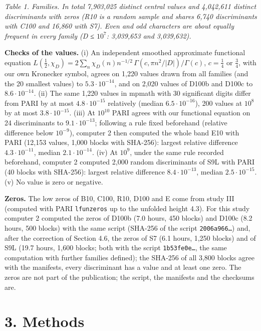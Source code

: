 \documentclass[
  10pt,
]{article}
\begin{document}
\emph{Table 1. Families. In total 7,903,025 distinct central values and
4,042,611 distinct discriminants with zeros (R10 is a random sample and
shares 6,740 discriminants with C100 and 16,860 with S7). Even and odd
characters are about equally frequent in every family
(\textbar D\textbar{} ≤ \(10^7\): 3,039,653 and 3,039,632).}

\textbf{Checks of the values.} (i) An independent smoothed approximate
functional equation
\(L(\tfrac12, \chi_D) = 2\sum_n \chi_D(n) n^{-1/2}\,\Gamma(c, \pi n^2/|D|)/\Gamma(c)\),
\(c = \tfrac14\) or \(\tfrac34\), with our own Kronecker symbol, agrees
on 1,220 values drawn from all families (and the 20 smallest values) to
\(5.3\cdot10^{-14}\), and on 2,020 values of D100b and D100c to
\(8.6\cdot10^{-14}\). (ii) The same 1,220 values in mpmath with 30
significant digits differ from PARI by at most \(4.8\cdot10^{-15}\)
relatively (median \(6.5\cdot10^{-16}\)), 200 values at \(10^8\) by at
most \(3.8\cdot10^{-15}\). (iii) At \(10^{10}\) PARI agrees with our
functional equation on 24 discriminants to \(9.1\cdot10^{-13}\);
following a rule fixed beforehand (relative difference below
\(10^{-9}\)), computer 2 then computed the whole band E10 with PARI
(12,153 values, 1,000 blocks with SHA-256): largest relative difference
\(4.3\cdot10^{-11}\), median \(2.1\cdot10^{-14}\). (iv) At \(10^9\),
under the same rule recorded beforehand, computer 2 computed 2,000
random discriminants of S9L with PARI (40 blocks with SHA-256): largest
relative difference \(8.4\cdot10^{-13}\), median \(2.5\cdot10^{-15}\).
(v) No value is zero or negative.

\textbf{Zeros.} The low zeros of B10, C100, R10, D100 and E come from
study III (computed with PARI \texttt{lfunzeros} up to the unfolded
height 4.3). For this study computer 2 computed the zeros of D100b (7.0
hours, 450 blocks) and D100c (8.2 hours, 500 blocks) with the same
script (SHA-256 of the script \texttt{2006a966…}) and, after the
correction of Section 4.6, the zeros of S7 (6.1 hours, 1,250 blocks) and
of S9L (19.7 hours, 1,600 blocks; both with the script
\texttt{1b53fe0e…}, the same computation with further families defined);
the SHA-256 of all 3,800 blocks agree with the manifests, every
discriminant has a value and at least one zero. The zeros are not part
of the publication; the script, the manifests and the checksums are.

\hypertarget{methods}{%
\section{3. Methods}\label{methods}}
\end{document}
